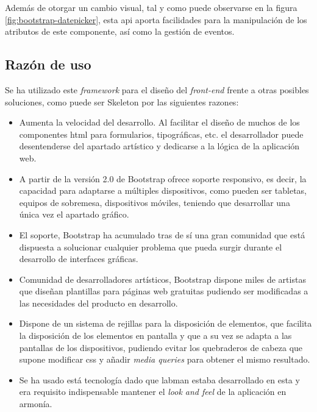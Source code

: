 Además de otorgar un cambio visual, tal y como puede observarse en la figura \ref{fig:bootstrap-datepicker}, esta \acrshort{api} aporta facilidades para la manipulación de los atributos de este componente, así como la gestión de eventos.

\subsection{Razón de uso}

Se ha utilizado este \textit{framework} para el diseño del \textit{front-end} frente a otras posibles soluciones, como puede ser Skeleton\cite{Skeleton} por las siguientes razones:

\begin{itemize}
	\item Aumenta la velocidad del desarrollo. Al facilitar el diseño de muchos de los componentes \acrshort{html} para formularios, tipográficas, etc. el desarrollador puede desentenderse del apartado artístico y dedicarse a la lógica de la aplicación web.
	\item A partir de la versión 2.0 de Bootstrap ofrece soporte responsivo, es decir, la capacidad para adaptarse a múltiples dispositivos, como pueden ser tabletas, equipos de sobremesa, dispositivos móviles, teniendo que desarrollar una única vez el apartado gráfico.
	\item El soporte, Bootstrap ha acumulado tras de sí una gran comunidad que está dispuesta a solucionar cualquier problema que pueda surgir durante el desarrollo de interfaces gráficas.
	\item Comunidad de desarrolladores artísticos, Bootstrap dispone miles de artistas que diseñan plantillas para páginas web gratuitas pudiendo ser modificadas a las necesidades del producto en desarrollo.
	\item Dispone de un sistema de rejillas para la disposición de elementos, que facilita la disposición de los elementos en pantalla y que a su vez se adapta a las pantallas de los dispositivos, pudiendo evitar los quebraderos de cabeza que supone modificar \acrshort{css} y añadir \textit{media queries} para obtener el mismo resultado.
	\item Se ha usado está tecnología dado que \acrshort{labman} estaba desarrollado en esta y era requisito indispensable mantener el \textit{look and feel} de la aplicación en armonía.
\end{itemize}
